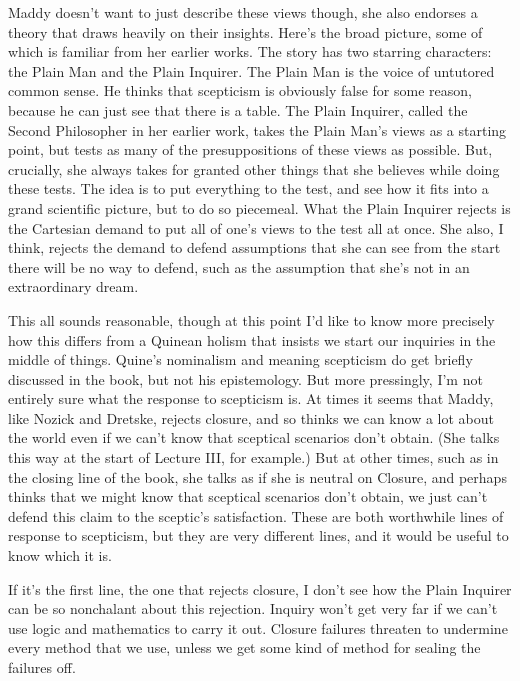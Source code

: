 \documentclass[
  11pt,
  letterpaper,
  DIV=11,
  numbers=noendperiod,
  twoside]{scrartcl}
\begin{document}
Maddy doesn't want to just describe these views though, she also
endorses a theory that draws heavily on their insights. Here's the broad
picture, some of which is familiar from her earlier works. The story has
two starring characters: the Plain Man and the Plain Inquirer. The Plain
Man is the voice of untutored common sense. He thinks that scepticism is
obviously false for some reason, because he can just see that there is a
table. The Plain Inquirer, called the Second Philosopher in her earlier
work, takes the Plain Man's views as a starting point, but tests as many
of the presuppositions of these views as possible. But, crucially, she
always takes for granted other things that she believes while doing
these tests. The idea is to put everything to the test, and see how it
fits into a grand scientific picture, but to do so piecemeal. What the
Plain Inquirer rejects is the Cartesian demand to put all of one's views
to the test all at once. She also, I think, rejects the demand to defend
assumptions that she can see from the start there will be no way to
defend, such as the assumption that she's not in an extraordinary dream.

This all sounds reasonable, though at this point I'd like to know more
precisely how this differs from a Quinean holism that insists we start
our inquiries in the middle of things. Quine's nominalism and meaning
scepticism do get briefly discussed in the book, but not his
epistemology. But more pressingly, I'm not entirely sure what the
response to scepticism is. At times it seems that Maddy, like Nozick and
Dretske, rejects closure, and so thinks we can know a lot about the
world even if we can't know that sceptical scenarios don't obtain. (She
talks this way at the start of Lecture III, for example.) But at other
times, such as in the closing line of the book, she talks as if she is
neutral on Closure, and perhaps thinks that we might know that sceptical
scenarios don't obtain, we just can't defend this claim to the sceptic's
satisfaction. These are both worthwhile lines of response to scepticism,
but they are very different lines, and it would be useful to know which
it is.

If it's the first line, the one that rejects closure, I don't see how
the Plain Inquirer can be so nonchalant about this rejection. Inquiry
won't get very far if we can't use logic and mathematics to carry it
out. Closure failures threaten to undermine every method that we use,
unless we get some kind of method for sealing the failures off.
\end{document}
